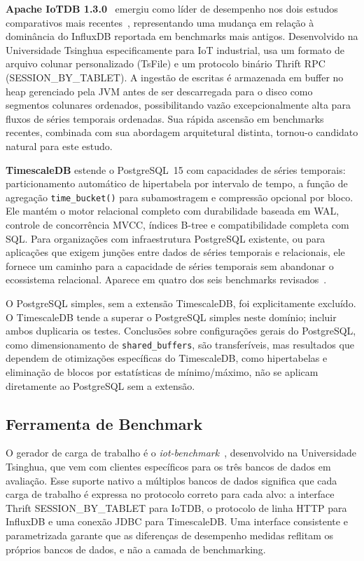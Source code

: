 \textbf{Apache IoTDB 1.3.0}~\cite{wang2023iotdb} emergiu como líder de desempenho nos dois
estudos comparativos mais recentes~\citep{pereira2023mulletbench,wang2023iotdb}, representando
uma mudança em relação à dominância do InfluxDB reportada em benchmarks mais antigos.
Desenvolvido na Universidade Tsinghua especificamente para IoT industrial, usa um formato de
arquivo colunar personalizado (TsFile) e um protocolo binário Thrift RPC
(SESSION\_BY\_TABLET). A ingestão de escritas é armazenada em buffer no heap gerenciado pela
JVM antes de ser descarregada para o disco como segmentos colunares ordenados, possibilitando
vazão excepcionalmente alta para fluxos de séries temporais ordenadas. Sua rápida ascensão em
benchmarks recentes, combinada com sua abordagem arquitetural distinta, tornou-o candidato
natural para este estudo.

\textbf{TimescaleDB} estende o PostgreSQL~15 com capacidades de séries temporais: particionamento
automático de hipertabela por intervalo de tempo, a função de agregação \texttt{time\_bucket()}
para subamostragem e compressão opcional por bloco. Ele mantém o motor relacional completo com
durabilidade baseada em WAL, controle de concorrência MVCC, índices B-tree e compatibilidade
completa com SQL. Para organizações com infraestrutura PostgreSQL existente, ou para aplicações
que exigem junções entre dados de séries temporais e relacionais, ele fornece um caminho para
a capacidade de séries temporais sem abandonar o ecossistema relacional. Aparece em quatro dos
seis benchmarks revisados~\citep{shah2022performance,lima2024avaliando,wang2023iotdb,grzesik2020comparative}.

O PostgreSQL simples, sem a extensão TimescaleDB, foi explicitamente excluído. O TimescaleDB
tende a superar o PostgreSQL simples neste domínio; incluir ambos duplicaria os testes.
Conclusões sobre configurações gerais do PostgreSQL, como dimensionamento de
\texttt{shared\_buffers}, são transferíveis, mas resultados que dependem de otimizações
específicas do TimescaleDB, como hipertabelas e eliminação de blocos por estatísticas de
mínimo/máximo, não se aplicam diretamente ao PostgreSQL sem a extensão.

\subsection{Ferramenta de Benchmark}
\label{sec:benchmark-tool}

O gerador de carga de trabalho é o \textit{iot-benchmark}~\cite{iotbenchmark}, desenvolvido na
Universidade Tsinghua, que vem com clientes específicos para os três bancos de dados em
avaliação. Esse suporte nativo a múltiplos bancos de dados significa que cada carga de trabalho
é expressa no protocolo correto para cada alvo: a interface Thrift SESSION\_BY\_TABLET para
IoTDB, o protocolo de linha HTTP para InfluxDB e uma conexão JDBC para TimescaleDB. Uma
interface consistente e parametrizada garante que as diferenças de desempenho medidas reflitam
os próprios bancos de dados, e não a camada de benchmarking.

